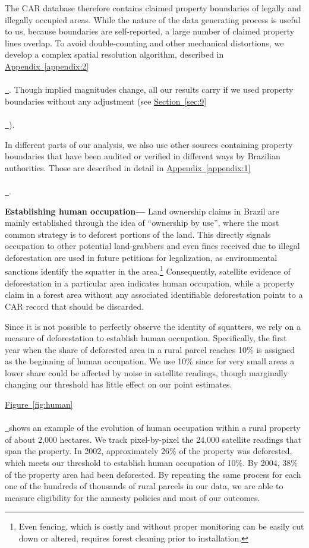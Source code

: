 \documentclass[12pt]{article}
\newcommand*{\figref}[2][]{%
  \hyperref[{fig:#2}]{%
    Figure~\ref*{fig:#2}%
    \ifx\\#1\\%
    \else
      \,#1%
    \fi
  }%
}
\newcommand*{\sectionref}[2][]{%
  \hyperref[{sec:#2}]{%
    Section~\ref*{sec:#2}%
    \ifx\\#1\\%
    \else
      \,#1%
    \fi
  }%
}
\newcommand*{\appendixref}[2][]{%
  \hyperref[{appendix:#2}]{%
    Appendix~\ref*{appendix:#2}%
    \ifx\\#1\\%
    \else
      \,#1%
    \fi
  }%
}
\begin{document}
\quad The CAR database therefore contains claimed property boundaries of legally and illegally occupied areas. While the nature of the data generating process is useful to us, because boundaries are self-reported, a large number of claimed property lines overlap. To avoid double-counting and other mechanical distortions, we develop a complex spatial resolution algorithm, described in \appendixref{2}. Though implied magnitudes change, all our results carry if we used property boundaries without any adjustment (see \sectionref{9}).
\ 

\quad In different parts of our analysis, we also use other sources containing property boundaries that have been audited or verified in different ways by Brazilian authorities. Those are described in detail in \appendixref{1}.
\ 

\quad \textbf{Establishing human occupation---} Land ownership claims in Brazil are mainly established through the idea of ``ownership by use'', where the most common strategy is to deforest portions of the land. This directly signals occupation to other potential land-grabbers and even fines received due to illegal deforestation are used in future petitions for legalization, as environmental sanctions identify the squatter in the area.\footnote{Even fencing, which is costly and without proper monitoring can be easily cut down or altered, requires forest cleaning prior to installation.} Consequently, satellite evidence of deforestation in a particular area indicates human occupation, while a property claim in a forest area without any associated identifiable deforestation points to a CAR record that should be discarded. 
\ 

\quad Since it is not possible to perfectly observe the identity of squatters, we rely on a measure of deforestation to establish human occupation. Specifically, the first year when the share of deforested area in a rural parcel reaches 10\% is assigned as the beginning of human occupation. We use 10\% since for very small areas a lower share could be affected by noise in satellite readings, though marginally changing our threshold has little effect on our point estimates. 
\

\quad \figref{human} shows an example of the evolution of human occupation within a rural property of about 2,000 hectares. We track pixel-by-pixel the 24,000 satellite readings that span the property. In 2002, approximately 26\% of the property was deforested, which meets our threshold to establish human occupation of 10\%. By 2004, 38\% of the property area had been deforested. By repeating the same process for each one of the hundreds of thousands of rural parcels in our data, we are able to measure eligibility for the amnesty policies and most of our outcomes.
\end{document}
